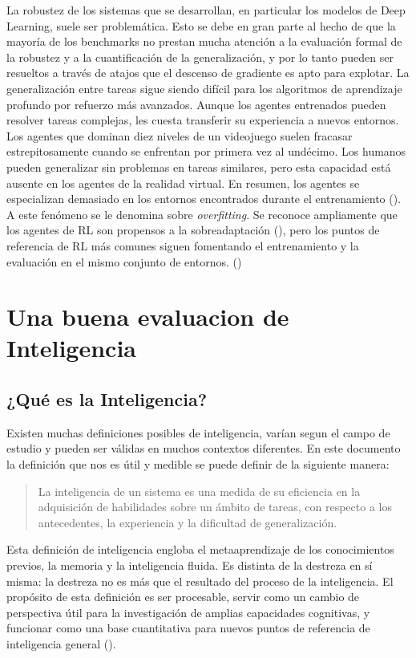 La robustez de los sistemas que se desarrollan, en particular los modelos de Deep Learning, suele ser problemática. Esto se debe en gran parte al hecho de que la mayoría de los benchmarks no prestan mucha atención a la evaluación formal de la robustez y a la cuantificación de la generalización, y por lo tanto pueden ser resueltos a través de atajos que el descenso de gradiente es apto para explotar. La generalización entre tareas sigue siendo difícil para los algoritmos de aprendizaje profundo por refuerzo más avanzados. Aunque los agentes entrenados pueden resolver tareas complejas, les cuesta transferir su experiencia a nuevos entornos. Los agentes que dominan diez niveles de un videojuego suelen fracasar estrepitosamente cuando se enfrentan por primera vez al undécimo. Los humanos pueden generalizar sin problemas en tareas similares, pero esta capacidad está ausente en los agentes de la realidad virtual. En resumen, los agentes se especializan demasiado en los entornos encontrados durante el entrenamiento (\cite{cobbe2019quantifying}). A este fenómeno se le denomina sobre \textit{overfitting}. Se reconoce ampliamente que los agentes de RL son propensos a la sobreadaptación (\cite{zhang2018study}), pero los puntos de referencia de RL más comunes siguen fomentando el entrenamiento y la evaluación en el mismo conjunto de entornos. (\cite{nichol2018gotta}) 

\section{Una buena evaluacion de Inteligencia}\label{section:state-of-the-art:a-good-measure-of-inteligence}

\subsection{¿Qué es la Inteligencia?}
Existen muchas definiciones posibles de inteligencia, varían segun el campo de estudio y pueden ser válidas en muchos contextos diferentes. En este documento la definición que nos es útil y medible se puede definir de la siguiente manera:

\begin{quote}
    La inteligencia de un sistema es una medida de su eficiencia en la adquisición de habilidades sobre un ámbito de tareas, con respecto a los antecedentes, la experiencia y la dificultad de generalización.
\end{quote}

Esta definición de inteligencia engloba el metaaprendizaje de los conocimientos previos, la memoria y la inteligencia fluida. Es distinta de la destreza en sí misma: la destreza no es más que el resultado del proceso de la inteligencia. El propósito de esta definición es ser procesable, servir como un cambio de perspectiva útil para la investigación de amplias capacidades cognitivas, y funcionar como una base cuantitativa para nuevos puntos de referencia de inteligencia general (\cite{chollet2019measure}).

